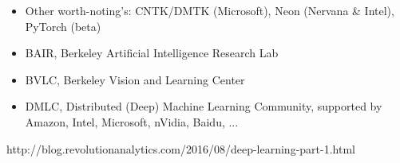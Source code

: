 \begin{frame}
\vskip -10pt
{\scriptsize
\begin{itemize}\setlength\itemsep{0.5em}
\item[\raisebox{-0.4ex}{\alert{\HandRight}}] Other worth-noting's: CNTK/DMTK (Microsoft), Neon (Nervana \& Intel), PyTorch (\alert{beta})
\item BAIR, Berkeley Artificial Intelligence Research Lab 
\item BVLC, Berkeley Vision and Learning Center
\item DMLC, Distributed (Deep) Machine Learning Community, supported by Amazon, Intel, Microsoft, nVidia, Baidu, ...
\end{itemize}
}

\begin{center}
{\color{red}\scriptsize
http://blog.revolutionanalytics.com/2016/08/deep-learning-part-1.html
}
\end{center}

\end{frame}



